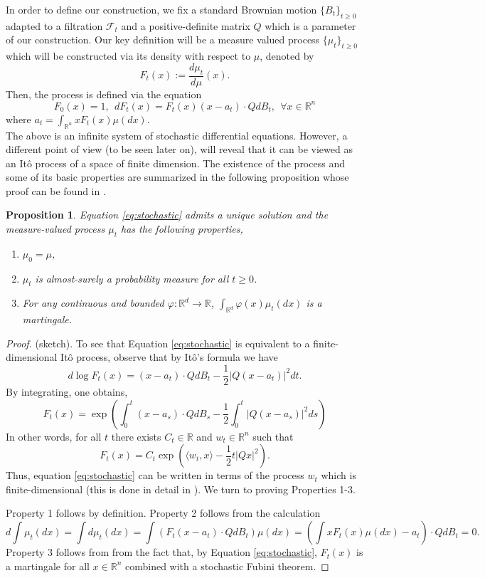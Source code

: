 \documentclass[12pt]{article}
\def \RR {\mathbb R}
\def \FF {\mathcal{F}}
\newtheorem{proposition}[theorem]{Proposition}
\theoremstyle{definition}
\theoremstyle{remark}
\begin{document}
In order to define our construction, we fix a standard Brownian motion $\{B_t\}_{t \geq 0}$ adapted to a filtration $\FF_t$ and a positive-definite matrix $Q$ which is a parameter of our construction. Our key definition will be a measure valued process $\{ \mu_t \}_{t \geq 0}$ which will be constructed via its density with respect to $\mu$, denoted by
$$
F_t(x) := \frac{d \mu_t}{d \mu} (x).
$$
Then, the process is defined via the equation
\begin{equation}\label{eq:stochastic}
F_0(x) = 1, ~~ d F_t(x) = F_t(x) (x - a_t) \cdot Q d B_t, ~~ \forall x \in \RR^n
\end{equation}
where $a_t = \int_{\RR^n} x F_t(x) \mu(dx)$. \\

The above is an infinite system of stochastic differential equations. However, a different point of view (to be seen later on), will reveal that it can be viewed as an It\^o process of a space of finite dimension. The existence of the process and some of its basic properties are summarized in the following proposition whose proof can be found in \cite{eldan2016skorokhod, EMZ-CLT}.

\begin{proposition} \label{prop:stochastic-localization}
	Equation \eqref{eq:stochastic} admits a unique solution and the measure-valued process $\mu_t$ has the following properties,
	\begin{enumerate}
		\item $\mu_0 = \mu$,
		\item $\mu_t$ is almost-surely a probability measure for all $t \geq 0$.
		\item For any continuous and bounded $\varphi : \RR^d \to \RR$, $\int_{\RR^d} \varphi(x) \mu_t(dx)$ is a martingale. \label{item:martingale}
	\end{enumerate}
\end{proposition}
\begin{proof} (sketch).
To see that Equation \eqref{eq:stochastic} is equivalent to a finite-dimensional It\^o process, observe that by It\^o's formula we have
$$
d \log F_t(x) = (x - a_t) \cdot Q d B_t - \frac{1}{2} |Q (x- a_t)|^2 dt.
$$
By integrating, one obtains,
$$
F_t(x) = \exp \left (   \int_0^t (x - a_s) \cdot Q d B_s - \frac{1}{2} \int_0^t |Q (x- a_s)|^2 ds \right )
$$
In other words, for all $t$ there exists $C_t \in \RR$ and $w_t \in \RR^n$ such that 
$$
F_t(x) = C_t \exp \left (   \langle w_t, x \rangle - \frac{1}{2} t |Q x|^2  \right ).
$$
Thus, equation \eqref{eq:stochastic} can be written in terms of the process $w_t$ which is finite-dimensional (this is done in detail in \cite{EMZ-CLT}). We turn to proving Properties 1-3.

Property 1 follows by definition. Property 2 follows from the calculation
$$
d \int \mu_t(dx) = \int d \mu_t(dx) = \int \left (F_t (x - a_t) \cdot Q d B_t \right ) \mu(dx) = \left ( \int x F_t(x) \mu(dx) - a_t \right ) \cdot Q d B_t = 0.
$$
Property 3 follows from from the fact that, by Equation \eqref{eq:stochastic}, $F_t(x)$ is a martingale for all $x \in \RR^n$ combined with a stochastic Fubini theorem.
\end{proof}
\end{document}
